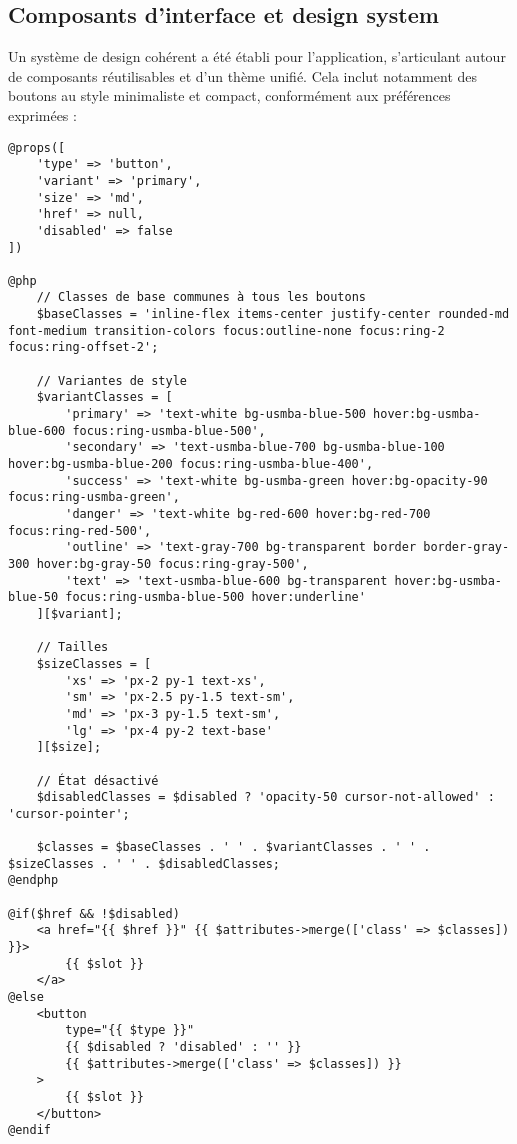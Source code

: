 \documentclass[french,12pt]{report} %
\begin{document}
\subsection{Composants d'interface et design system}

Un système de design cohérent a été établi pour l'application, s'articulant autour de composants réutilisables et d'un thème unifié. Cela inclut notamment des boutons au style minimaliste et compact, conformément aux préférences exprimées :

\begin{lstlisting}[style=htmlstyle,caption={Définition des composants de bouton (resources/views/components/button.blade.php)}]
@props([
    'type' => 'button',
    'variant' => 'primary',
    'size' => 'md',
    'href' => null,
    'disabled' => false
])

@php
    // Classes de base communes à tous les boutons
    $baseClasses = 'inline-flex items-center justify-center rounded-md font-medium transition-colors focus:outline-none focus:ring-2 focus:ring-offset-2';
    
    // Variantes de style
    $variantClasses = [
        'primary' => 'text-white bg-usmba-blue-500 hover:bg-usmba-blue-600 focus:ring-usmba-blue-500',
        'secondary' => 'text-usmba-blue-700 bg-usmba-blue-100 hover:bg-usmba-blue-200 focus:ring-usmba-blue-400',
        'success' => 'text-white bg-usmba-green hover:bg-opacity-90 focus:ring-usmba-green',
        'danger' => 'text-white bg-red-600 hover:bg-red-700 focus:ring-red-500',
        'outline' => 'text-gray-700 bg-transparent border border-gray-300 hover:bg-gray-50 focus:ring-gray-500',
        'text' => 'text-usmba-blue-600 bg-transparent hover:bg-usmba-blue-50 focus:ring-usmba-blue-500 hover:underline'
    ][$variant];
    
    // Tailles
    $sizeClasses = [
        'xs' => 'px-2 py-1 text-xs',
        'sm' => 'px-2.5 py-1.5 text-sm',
        'md' => 'px-3 py-1.5 text-sm',
        'lg' => 'px-4 py-2 text-base'
    ][$size];
    
    // État désactivé
    $disabledClasses = $disabled ? 'opacity-50 cursor-not-allowed' : 'cursor-pointer';
    
    $classes = $baseClasses . ' ' . $variantClasses . ' ' . $sizeClasses . ' ' . $disabledClasses;
@endphp

@if($href && !$disabled)
    <a href="{{ $href }}" {{ $attributes->merge(['class' => $classes]) }}>
        {{ $slot }}
    </a>
@else
    <button
        type="{{ $type }}"
        {{ $disabled ? 'disabled' : '' }}
        {{ $attributes->merge(['class' => $classes]) }}
    >
        {{ $slot }}
    </button>
@endif
\end{lstlisting}
\end{document}
